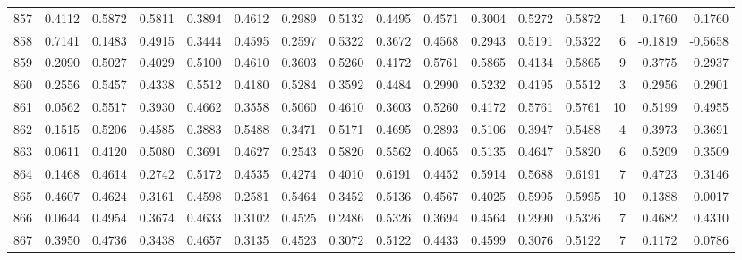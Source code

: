 \begin{tabular}{lrrrrrrrrrrrrrrr}
857 &      0.4112 &  0.5872 &  0.5811 &  0.3894 &  0.4612 &  0.2989 &  0.5132 &  0.4495 &  0.4571 &  0.3004 &   0.5272 &     0.5872 &      1 &                    0.1760 &                     0.1760 \\
858 &      0.7141 &  0.1483 &  0.4915 &  0.3444 &  0.4595 &  0.2597 &  0.5322 &  0.3672 &  0.4568 &  0.2943 &   0.5191 &     0.5322 &      6 &                   -0.1819 &                    -0.5658 \\
859 &      0.2090 &  0.5027 &  0.4029 &  0.5100 &  0.4610 &  0.3603 &  0.5260 &  0.4172 &  0.5761 &  0.5865 &   0.4134 &     0.5865 &      9 &                    0.3775 &                     0.2937 \\
860 &      0.2556 &  0.5457 &  0.4338 &  0.5512 &  0.4180 &  0.5284 &  0.3592 &  0.4484 &  0.2990 &  0.5232 &   0.4195 &     0.5512 &      3 &                    0.2956 &                     0.2901 \\
861 &      0.0562 &  0.5517 &  0.3930 &  0.4662 &  0.3558 &  0.5060 &  0.4610 &  0.3603 &  0.5260 &  0.4172 &   0.5761 &     0.5761 &     10 &                    0.5199 &                     0.4955 \\
862 &      0.1515 &  0.5206 &  0.4585 &  0.3883 &  0.5488 &  0.3471 &  0.5171 &  0.4695 &  0.2893 &  0.5106 &   0.3947 &     0.5488 &      4 &                    0.3973 &                     0.3691 \\
863 &      0.0611 &  0.4120 &  0.5080 &  0.3691 &  0.4627 &  0.2543 &  0.5820 &  0.5562 &  0.4065 &  0.5135 &   0.4647 &     0.5820 &      6 &                    0.5209 &                     0.3509 \\
864 &      0.1468 &  0.4614 &  0.2742 &  0.5172 &  0.4535 &  0.4274 &  0.4010 &  0.6191 &  0.4452 &  0.5914 &   0.5688 &     0.6191 &      7 &                    0.4723 &                     0.3146 \\
865 &      0.4607 &  0.4624 &  0.3161 &  0.4598 &  0.2581 &  0.5464 &  0.3452 &  0.5136 &  0.4567 &  0.4025 &   0.5995 &     0.5995 &     10 &                    0.1388 &                     0.0017 \\
866 &      0.0644 &  0.4954 &  0.3674 &  0.4633 &  0.3102 &  0.4525 &  0.2486 &  0.5326 &  0.3694 &  0.4564 &   0.2990 &     0.5326 &      7 &                    0.4682 &                     0.4310 \\
867 &      0.3950 &  0.4736 &  0.3438 &  0.4657 &  0.3135 &  0.4523 &  0.3072 &  0.5122 &  0.4433 &  0.4599 &   0.3076 &     0.5122 &      7 &                    0.1172 &                     0.0786 \\

\end{tabular}
